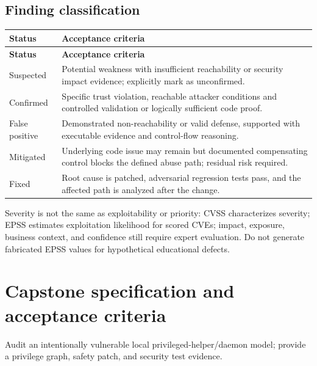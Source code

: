 \documentclass[10pt,letterpaper]{article}
\begin{document}
\subsection{Finding classification}
\begingroup\footnotesize\setlength\tabcolsep{3pt}
\begin{longtable}{>{\raggedright\arraybackslash}p{}>{\raggedright\arraybackslash}p{}}\toprule
\textbf{Status} & \textbf{Acceptance criteria}\\\midrule\endfirsthead
\toprule \textbf{Status} & \textbf{Acceptance criteria}\\\midrule\endhead
Suspected & Potential weakness with insufficient reachability or security impact evidence; explicitly mark as unconfirmed.\\\midrule
Confirmed & Specific trust violation, reachable attacker conditions and controlled validation or logically sufficient code proof.\\\midrule
False positive & Demonstrated non-reachability or valid defense, supported with executable evidence and control-flow reasoning.\\\midrule
Mitigated & Underlying code issue may remain but documented compensating control blocks the defined abuse path; residual risk required.\\\midrule
Fixed & Root cause is patched, adversarial regression tests pass, and the affected path is analyzed after the change.\\\midrule
\bottomrule\end{longtable}\endgroup
Severity is not the same as exploitability or priority: CVSS characterizes severity; EPSS estimates exploitation likelihood for scored CVEs; impact, exposure, business context, and confidence still require expert evaluation. Do not generate fabricated EPSS values for hypothetical educational defects.

\section{Capstone specification and acceptance criteria}
Audit an intentionally vulnerable local privileged-helper/daemon model; provide a privilege graph, safety patch, and security test evidence.
\end{document}
